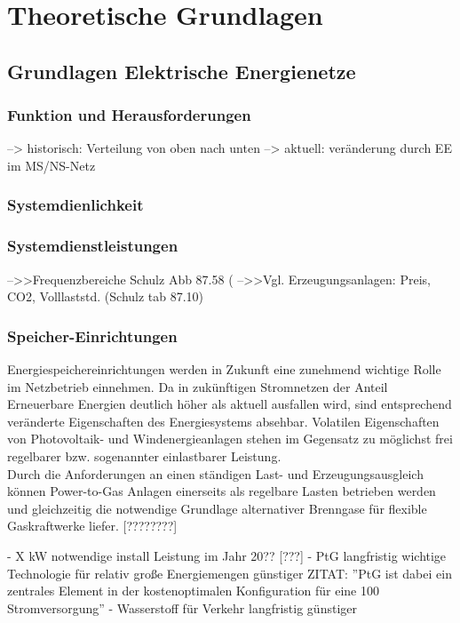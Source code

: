 \documentclass[onecolumn,10pt,titlepage]{article}
\begin{document}
\section{Theoretische Grundlagen}
\subsection{Grundlagen Elektrische Energienetze}
\subsubsection{Funktion und Herausforderungen}
--> historisch: Verteilung von oben nach unten
--> aktuell: veränderung durch EE im MS/NS-Netz

\subsubsection{Systemdienlichkeit}

\subsubsection{Systemdienstleistungen}
-->>Frequenzbereiche Schulz Abb 87.58 (
-->>Vgl. Erzeugungsanlagen: Preis, CO2, Volllaststd. (Schulz tab 87.10)

\subsubsection{Speicher-Einrichtungen}
Energiespeichereinrichtungen werden in Zukunft eine zunehmend wichtige Rolle im Netzbetrieb einnehmen. \cite{Schmiegel2019}
Da in zukünftigen Stromnetzen der Anteil Erneuerbare Energien deutlich höher als aktuell ausfallen wird, sind entsprechend veränderte Eigenschaften des Energiesystems absehbar. Volatilen Eigenschaften von Photovoltaik- und Windenergieanlagen stehen im Gegensatz zu möglichst frei regelbarer bzw. sogenannter einlastbarer Leistung.\cite{Matthes2018}\\
Durch die Anforderungen an einen ständigen Last- und Erzeugungsausgleich können Power-to-Gas Anlagen einerseits als regelbare Lasten betrieben werden und gleichzeitig die notwendige Grundlage alternativer Brenngase für flexible Gaskraftwerke liefer. [????????]

- X kW notwendige install Leistung im Jahr 20?? [???]
- PtG langfristig wichtige Technologie für relativ große Energiemengen günstiger \cite{Schroeer2015}
ZITAT: ''PtG
ist dabei ein zentrales Element in der kostenoptimalen Konfiguration für eine 100%
Stromversorgung''
- Wasserstoff für Verkehr langfristig günstiger \cite{Robinius2018}
\end{document}
